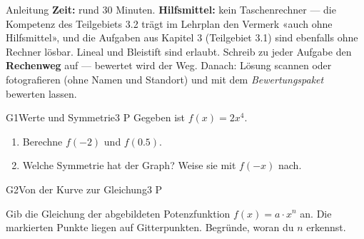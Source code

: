 \documentclass[11pt]{article}
\begin{document}

\begin{lpinfo}{Anleitung}
\textbf{Zeit:} rund 30 Minuten. \textbf{Hilfsmittel:} kein Taschenrechner — die Kompetenz des Teilgebiets 3.2 trägt im Lehrplan den Vermerk «auch ohne Hilfsmittel», und die Aufgaben aus Kapitel 3 (Teilgebiet 3.1) sind ebenfalls ohne Rechner lösbar. Lineal und Bleistift sind erlaubt.
Schreib zu jeder Aufgabe den \textbf{Rechenweg} auf — bewertet wird der Weg.
Danach: Lösung scannen oder fotografieren (ohne Namen und Standort) und mit dem \emph{Bewertungspaket} bewerten lassen.
\end{lpinfo}


\begin{lpaufgabe}{G1}{Werte und Symmetrie}{3 P}
Gegeben ist $f(x) = 2x^{4}$.
\begin{enumerate}[label=(\alph*),leftmargin=*,itemsep=1pt]
\item Berechne $f(-2)$ und $f(0.5)$.
\item Welche Symmetrie hat der Graph? Weise sie mit $f(-x)$ nach.
\end{enumerate}
\end{lpaufgabe}

\begin{lpaufgabe}{G2}{Von der Kurve zur Gleichung}{3 P}
\begin{minipage}[t]{0.52\linewidth}
Gib die Gleichung der abgebildeten Potenzfunktion $f(x) = a \cdot x^{n}$ an.
Die markierten Punkte liegen auf Gitterpunkten. Begründe, woran du $n$ erkennst.
\end{minipage}\hfill
\begin{minipage}[t]{0.42\linewidth}\vspace{0pt}\centering
{}
\end{minipage}
\end{lpaufgabe}
\end{document}

